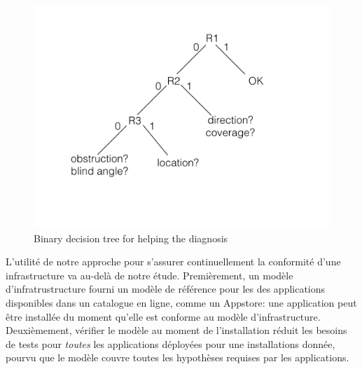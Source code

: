 \begin{figure}[!h]
  \centering
      \includegraphics[scale=0.3]{gfx/bdd.png}
      \caption{Binary decision tree for helping the diagnosis}
      \label{fig:bdd}
\end{figure}




L'utilité de notre approche pour s'assurer continuellement la conformité d'une infrastructure va au-delà de notre étude. Premièrement, un modèle d'infratrustructure fourni un modèle de référence pour les des applications disponibles dans un catalogue en ligne, comme un Appstore: une application peut être installée du moment qu'elle est conforme au modèle d'infrastructure. Deuxièmement, vérifier le modèle au moment de l'installation réduit les besoins de tests pour {\em toutes} les applications déployées pour une installations donnée, pourvu que le modèle couvre toutes les hypothèses requises par les applications.

